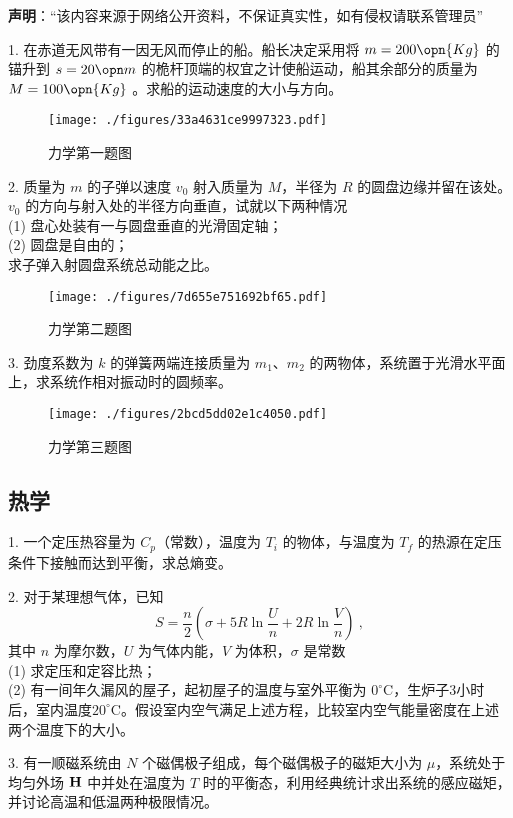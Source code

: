 
\textbf{声明}：“该内容来源于网络公开资料，不保证真实性，如有侵权请联系管理员”

1. 在赤道无风带有一因无风而停止的船。船长决定采用将 $m=200\opn{Kg}$ 的锚升到 $s=20\opn m$ 的桅杆顶端的权宜之计使船运动，船其余部分的质量为 $M=100 \opn{Kg}$ 。求船的运动速度的大小与方向。
\begin{figure}[ht]
\centering
\texttt{[image: ./figures/33a4631ce9997323.pdf]}
\caption{力学第一题图} \label{fig_NJU12_1}
\end{figure}
2. 质量为 $m$ 的子弹以速度 $v_0$ 射入质量为 $M$，半径为 $R$ 的圆盘边缘并留在该处。$v_0$ 的方向与射入处的半径方向垂直，试就以下两种情况\\
(1) 盘心处装有一与圆盘垂直的光滑固定轴；\\
(2) 圆盘是自由的；\\
求子弹入射圆盘系统总动能之比。
\begin{figure}[ht]
\centering
\texttt{[image: ./figures/7d655e751692bf65.pdf]}
\caption{力学第二题图} \label{fig_NJU12_2}
\end{figure}
3. 劲度系数为 $k$ 的弹簧两端连接质量为 $m_1$、$m_2$ 的两物体，系统置于光滑水平面上，求系统作相对振动时的圆频率。
\begin{figure}[ht]
\centering
\texttt{[image: ./figures/2bcd5dd02e1c4050.pdf]}
\caption{力学第三题图} \label{fig_NJU12_3}
\end{figure}
\subsection{热学}
1. 一个定压热容量为 $C_p$（常数），温度为 $T_i$ 的物体，与温度为 $T_f$ 的热源在定压条件下接触而达到平衡，求总熵变。

2. 对于某理想气体，已知
\begin{equation}
S=\frac n2 (\sigma+5R\ln{\frac Un}+2R\ln{\frac Vn})~,
\end{equation}
其中 $n$ 为摩尔数，$U$ 为气体内能，$V$ 为体积，$\sigma$ 是常数\\
(1) 求定压和定容比热；\\
(2) 有一间年久漏风的屋子，起初屋子的温度与室外平衡为 $0^\circ\mathrm{C}$，生炉子3小时后，室内温度$20^\circ\mathrm{C}$。假设室内空气满足上述方程，比较室内空气能量密度在上述两个温度下的大小。

3. 有一顺磁系统由 $N$ 个磁偶极子组成，每个磁偶极子的磁矩大小为 $\mu$，系统处于均匀外场 $\bf H$ 中并处在温度为 $T$ 时的平衡态，利用经典统计求出系统的感应磁矩，并讨论高温和低温两种极限情况。
